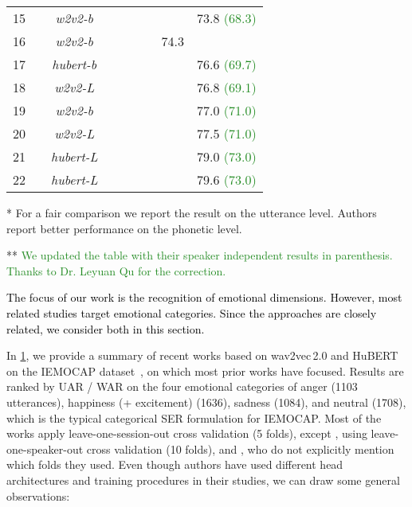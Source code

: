 \documentclass{article}
\newcommand\wbase{\mbox{\emph{w2v2-b}}}
\newcommand\hbase{\mbox{\emph{hubert-b}}}
\newcommand\wlarge{\mbox{\emph{w2v2-L}}}
\newcommand\hlarge{\mbox{\emph{hubert-L}}}
\newcommand{\review}[1]{\textcolor{black}{#1}}
\newcommand\iemocap{\mbox{IEMOCAP}}
\newcommand{\wtov}{wav2vec\,2.0}
\newcommand{\hubert}{HuBERT}
\renewcommand{\check}{\ding{51}}
\begin{document}
\begin{table}[!ht]
\begin{threeparttable}
\begin{tabular}{llcccccc}
            15 & \citep{wang2021finetuned} & \emph{\wbase} & ~ & \check & \check & & 73.8 \textcolor{ForestGreen}{(68.3)}\tnote{**}  \\
            16 & \citep{chen2021exploring} & \emph{\wbase} & ~ & ~ & \check & 74.3  & \\
            17 & \citep{wang2021finetuned} & \emph{\hbase} & ~ & ~ & \check & & 76.6 \textcolor{ForestGreen}{(69.7)}\tnote{**}  \\
            18 & \citep{wang2021finetuned} & \emph{\wlarge} & \check & \check & \check & & 76.8 \textcolor{ForestGreen}{(69.1)}\tnote{**}  \\
            19 & \citep{wang2021finetuned} & \emph{\wbase} & ~ & ~ & \check & & 77.0 \textcolor{ForestGreen}{(71.0)}\tnote{**}  \\
            20 & \citep{wang2021finetuned} & \emph{\wlarge} & \check & ~ & \check & & 77.5 \textcolor{ForestGreen}{(71.0)}\tnote{**} \\
            21 & \citep{wang2021finetuned} & \emph{\hlarge} & \check & \check & \check & & 79.0 \textcolor{ForestGreen}{(73.0)}\tnote{**}  \\
            22 & \citep{wang2021finetuned} & \emph{\hlarge} & \check & ~ & \check & & 79.6 \textcolor{ForestGreen}{(73.0)}\tnote{**} \\
\bottomrule
        \end{tabular}
        \begin{tablenotes}
            \item[*] For a fair comparison
            we report the result on the utterance level.
            Authors report better performance on the phonetic level.
            \item[**] \textcolor{ForestGreen}{We updated the table with their speaker independent results in parenthesis. Thanks to Dr. Leyuan Qu for the correction.}
      \end{tablenotes}
    \end{threeparttable}
    \label{tab:related-work-egemaps}
\end{table}

\review{The focus of our work is the recognition of emotional dimensions.
However, 
most related studies target emotional categories.
Since the approaches are closely related,
we consider both in this section.}

In \cref{tab:related-work-egemaps},
we provide a summary of recent works based on {\wtov} and {\hubert}
on the {\iemocap} dataset~\citep{busso2008iemocap},
on which most prior works have focused.
Results are ranked by \acf{UAR} / \acf{WAR}
on the four emotional categories of
anger (1103 utterances),
happiness (+ excitement) (1636),
sadness (1084),
and neutral (1708),
which is the typical categorical \ac{SER} formulation for {\iemocap}.
Most of the works apply leave-one-session-out cross validation (5 folds),
except \citet{yuan2021role},
using leave-one-speaker-out cross validation (10 folds),
and \citet{wang2021finetuned},
who do not explicitly mention which folds they used.
Even though
authors have used different head architectures and training procedures in their studies,
we can draw some general observations:
\end{document}
